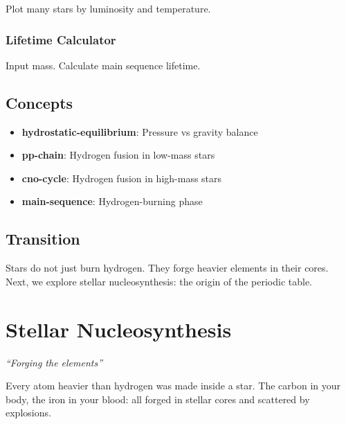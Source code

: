 \documentclass[
  11pt,
  letterpaper,
  twoside,
  openright]{book}
\providecommand{\tightlist}{%
  \setlength{\itemsep}{0pt}\setlength{\parskip}{0pt}}
\begin{document}
Plot many stars by luminosity and temperature.

\subsection{Lifetime Calculator}\label{lifetime-calculator}

Input mass. Calculate main sequence lifetime.

\section{Concepts}\label{concepts-20}

\begin{itemize}
\tightlist
\item
  \textbf{hydrostatic-equilibrium}: Pressure vs gravity balance
\item
  \textbf{pp-chain}: Hydrogen fusion in low-mass stars
\item
  \textbf{cno-cycle}: Hydrogen fusion in high-mass stars
\item
  \textbf{main-sequence}: Hydrogen-burning phase
\end{itemize}

\section{Transition}\label{transition-20}

Stars do not just burn hydrogen. They forge heavier elements in their
cores. Next, we explore stellar nucleosynthesis: the origin of the
periodic table.

\chapter{Stellar Nucleosynthesis}\label{sec-stellar-nucleosynthesis}

\emph{``Forging the elements''}

\begin{tcolorbox}[enhanced jigsaw, coltitle=black, colbacktitle=quarto-callout-note-color!10!white, toprule=.15mm, colframe=quarto-callout-note-color-frame, arc=.35mm, opacityback=0, bottomtitle=1mm, toptitle=1mm, breakable, colback=white, titlerule=0mm, opacitybacktitle=0.6, title=\textcolor{quarto-callout-note-color}{\faInfo}\hspace{0.5em}{Key Revelation}, rightrule=.15mm, bottomrule=.15mm, leftrule=.75mm, left=2mm]

Every atom heavier than hydrogen was made inside a star. The carbon in
your body, the iron in your blood: all forged in stellar cores and
scattered by explosions.

\end{tcolorbox}
\end{document}
